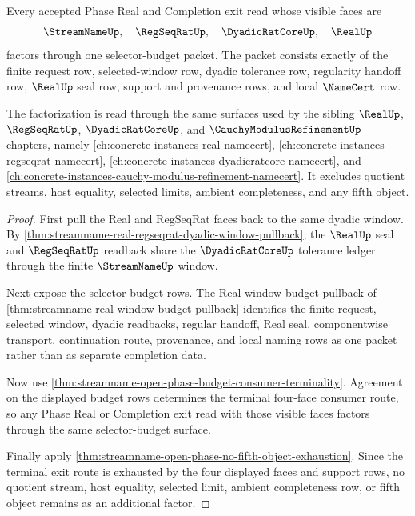 \begin{theorem}
\label{thm:streamname-regseqrat-real-selector-budget-normal-form}
Every accepted Phase Real and Completion exit read whose visible faces are
$$
\StreamNameUp,\quad \RegSeqRatUp,\quad \DyadicRatCoreUp,\quad \RealUp
$$
factors through one selector-budget packet. The packet consists exactly of the finite request row, selected-window row, dyadic tolerance row, regularity handoff row, $\RealUp$ seal row, support and provenance rows, and local $\NameCert$ row.

The factorization is read through the same surfaces used by the sibling $\RealUp$, $\RegSeqRatUp$, $\DyadicRatCoreUp$, and $\CauchyModulusRefinementUp$ chapters, namely \autoref{ch:concrete-instances-real-namecert}, \autoref{ch:concrete-instances-regseqrat-namecert}, \autoref{ch:concrete-instances-dyadicratcore-namecert}, and \autoref{ch:concrete-instances-cauchy-modulus-refinement-namecert}. It excludes quotient streams, host equality, selected limits, ambient completeness, and any fifth object.
\end{theorem}
\begin{proof}
First pull the Real and RegSeqRat faces back to the same dyadic window. By \autoref{thm:streamname-real-regseqrat-dyadic-window-pullback}, the $\RealUp$ seal and $\RegSeqRatUp$ readback share the $\DyadicRatCoreUp$ tolerance ledger through the finite $\StreamNameUp$ window.

Next expose the selector-budget rows. The Real-window budget pullback of \autoref{thm:streamname-real-window-budget-pullback} identifies the finite request, selected window, dyadic readbacks, regular handoff, Real seal, componentwise transport, continuation route, provenance, and local naming rows as one packet rather than as separate completion data.

Now use \autoref{thm:streamname-open-phase-budget-consumer-terminality}. Agreement on the displayed budget rows determines the terminal four-face consumer route, so any Phase Real or Completion exit read with those visible faces factors through the same selector-budget surface.

Finally apply \autoref{thm:streamname-open-phase-no-fifth-object-exhaustion}. Since the terminal exit route is exhausted by the four displayed faces and support rows, no quotient stream, host equality, selected limit, ambient completeness row, or fifth object remains as an additional factor.
\end{proof}

